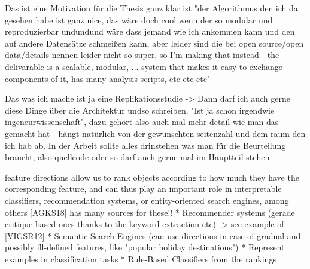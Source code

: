 Das ist eine Motivation für die Thesis ganz klar ist "der Algorithmus den ich da gesehen habe ist ganz nice, das wäre doch cool wenn der so modular und reproduzierbar undundund wäre dass jemand wie ich ankommen kann und den auf andere Datensätze schmeißen kann, aber leider sind die bei open source/open data/details nennen leider nicht so super, so I'm making that instead - the delivarable is a scalable, modular, ... system that makes it easy to exchange components of it, has many analysis-scripts, etc etc etc" 

Das was ich mache ist ja eine Replikationsstudie -> Dann darf ich auch gerne diese Dinge über die Architektur undso schreiben. "Ist ja schon irgendwie ingeneurwissenschaft", dazu gehört also auch mal mehr detail wie man das gemacht hat - hängt natürlich von der gewünschten seitenzahl und dem raum den ich hab ab. In der Arbeit sollte alles drinstehen was man für die Beurteilung braucht, also quellcode oder so darf auch gerne mal im Hauptteil stehen

feature directions allow us to rank objects according to how much they have the corresponding feature, and can thus play an important role in interpretable classifiers, recommendation systems, or entity-oriented search engines, among others  [AGKS18] has many sources for these!!
	* Recommender systems (gerade critique-based ones thanks to the keyword-extraction etc)
		-> see example of [VIGSR12]
	* Semantic Search Engines (can use directions in case of gradual and possibly ill-defined features, like "popular holiday destinations")
	* Represent examples in classification tasks
	* Rule-Based Classifiers from the rankings

